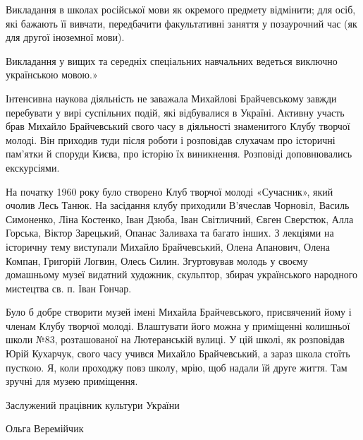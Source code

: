Викладання в школах російської мови як окремого предмету відмінити; для осіб,
які бажають її вивчати, передбачити факультативні заняття у позаурочний час (як
для другої іноземної мови).

Викладання у вищих та середніх спеціальних навчальних ведеться виключно
українською мовою.»

Інтенсивна наукова діяльність не заважала Михайлові Брайчевському завжди
перебувати у вирі суспільних подій, які відбувалися в Україні. Активну участь
брав Михайло Брайчевський свого часу в діяльності знаменитого Клубу творчої
молоді. Він приходив туди після роботи і розповідав слухачам про історичні
пам’ятки й споруди Києва, про історію їх виникнення. Розповіді доповнювались
екскурсіями.

На початку 1960 року було створено Клуб творчої молоді «Сучасник», який очолив
Лесь Танюк. На засідання клубу приходили В’ячеслав Чорновіл, Василь Симоненко,
Ліна Костенко, Іван Дзюба, Іван Світличний, Євген Сверстюк, Алла Горська,
Віктор Зарецький, Опанас Заливаха та багато інших. З лекціями на історичну тему
виступали Михайло Брайчевський, Олена Апанович, Олена Компан, Григорій Логвин,
Олесь Силин. Згуртовував молодь у своєму домашньому музеї видатний художник,
скульптор, збирач українського народного мистецтва св. п. Іван Гончар.

Було б добре створити музей імені Михайла Брайчевського, присвячений йому і
членам Клубу творчої молоді. Влаштувати його можна у приміщенні колишньої школи
№83, розташованої на Лютеранській вулиці. У цій школі, як розповідав Юрій
Кухарчук, свого часу учився Михайло Брайчевський, а зараз школа стоїть пусткою.
Я, коли проходжу повз школу, мрію, щоб надали їй друге життя. Там зручні для
музею приміщення.

Заслужений працівник культури України

Ольга Веремійчик

